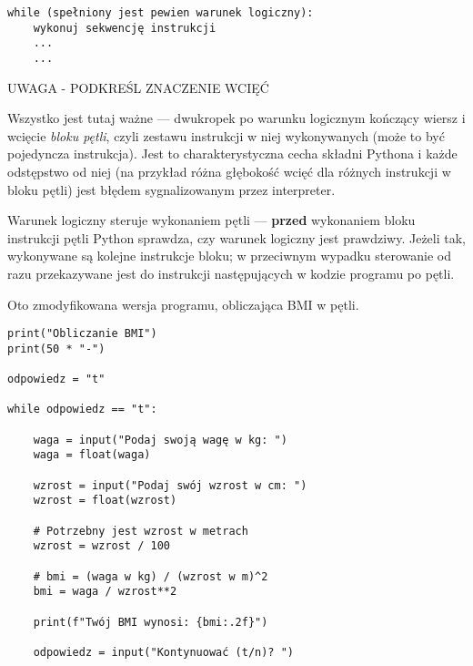 \documentclass[a4paper]{article}
\begin{document}
\lstset{numbers=none}
\begin{lstlisting}
while (spełniony jest pewien warunek logiczny):
    wykonuj sekwencję instrukcji
    ...
    ...
\end{lstlisting}

UWAGA - PODKREŚL ZNACZENIE WCIĘĆ

Wszystko jest tutaj ważne --- dwukropek po warunku logicznym kończący wiersz i wcięcie \emph{bloku pętli}, czyli zestawu instrukcji w niej wykonywanych (może to być pojedyncza instrukcja). Jest to charakterystyczna cecha składni Pythona i każde odstępstwo od niej (na przykład różna głębokość wcięć dla różnych instrukcji w bloku pętli) jest błędem sygnalizowanym przez interpreter.

Warunek logiczny steruje wykonaniem pętli --- \textbf{przed} wykonaniem bloku instrukcji pętli Python sprawdza, czy warunek logiczny jest prawdziwy. Jeżeli tak, wykonywane są kolejne instrukcje bloku; w przeciwnym wypadku sterowanie od razu przekazywane jest do instrukcji następujących w kodzie programu po pętli.

Oto zmodyfikowana wersja programu, obliczająca BMI w pętli.

\lstset{numbers=left}
\begin{lstlisting}
print("Obliczanie BMI")
print(50 * "-")

odpowiedz = "t"

while odpowiedz == "t":

    waga = input("Podaj swoją wagę w kg: ")
    waga = float(waga)

    wzrost = input("Podaj swój wzrost w cm: ")
    wzrost = float(wzrost)

    # Potrzebny jest wzrost w metrach
    wzrost = wzrost / 100

    # bmi = (waga w kg) / (wzrost w m)^2
    bmi = waga / wzrost**2

    print(f"Twój BMI wynosi: {bmi:.2f}")

    odpowiedz = input("Kontynuować (t/n)? ")
\end{lstlisting}
\end{document}
